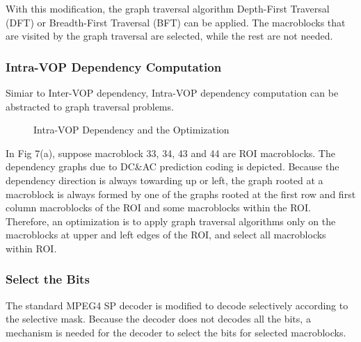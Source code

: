 With this modification, the graph traversal algorithm Depth-First Traversal (DFT) or Breadth-First Traversal (BFT) can be applied. The macroblocks that are visited by the graph traversal are selected, while the rest are not needed. 

\subsubsection{Intra-VOP Dependency Computation} 
Simiar to Inter-VOP dependency, Intra-VOP dependency computation can be abstracted to graph traversal problems. 
\begin{figure}
\centering
{}
\quad\quad\quad
{}
\caption[intra.eps]{Intra-VOP Dependency and the Optimization}
\end{figure}
In Fig 7(a), suppose macroblock 33, 34, 43 and 44 are ROI macroblocks. The dependency graphs due to DC\&AC prediction coding is depicted. Because the dependency direction is always towarding up or left, the graph rooted at a macroblock is always formed by one of the graphs rooted at the first row and first column macroblocks of the ROI and some macroblocks within the ROI. Therefore, an optimization is to apply graph traversal algorithms only on the macroblocks at upper and left edges of the ROI, and select all macroblocks within ROI.

\subsubsection{Select the Bits}
The standard MPEG4 SP decoder is modified to decode selectively according to the selective mask. Because the decoder does not decodes all the bits, a mechanism is needed for the decoder to select the bits for selected macroblocks. 

